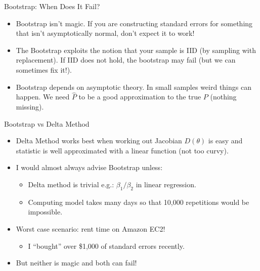   \begin{frame}{Bootstrap: When Does It Fail?}
  \begin{itemize}
  \item Bootstrap isn't magic. If you are constructing standard errors for something that isn't asymptotically normal, don't expect it to work!
  \item The Bootstrap exploits the notion that your sample is IID (by sampling with replacement). If IID does not hold, the bootstrap may fail (but we can sometimes fix it!).
  \item Bootstrap depends on asymptotic theory. In small samples weird things can happen. We need $\hat{P}$ to be a good approximation to the true $P$ (nothing missing).
  \end{itemize}
  \end{frame}
  
  
\begin{frame}{Bootstrap vs Delta Method}
  \begin{itemize}
  \item Delta Method works best when working out Jacobian $D(\theta)$ is easy and statistic is well approximated with a linear function (not too curvy).
  \item I would almost always advise Bootstrap unless:
  \begin{itemize}
  \item Delta method is trivial e.g.: $\beta_1 / \beta_2$ in linear regression.
  \item Computing model takes many days so that 10,000 repetitions would be impossible.
  \end{itemize}
  \item Worst case scenario: rent time on Amazon EC2!
  \begin{itemize}
  \item I ``bought'' over \$1,000 of standard errors recently.
  \end{itemize}
  \item But neither is magic and both can fail!
  \end{itemize}
\end{frame}

